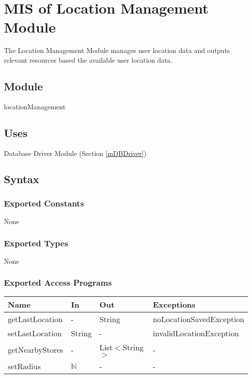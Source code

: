 \documentclass[12pt, titlepage]{article}
\begin{document}
\newpage

\section{MIS of Location Management Module} \label{mLocation} 
The Location Management Module manages user location data and outputs relevant resources based the available user location data.

\subsection{Module}

locationManagement

\subsection{Uses}

 Database Driver Module (Section \ref{mDBDriver})

\subsection{Syntax}

\subsubsection{Exported Constants}
None

\subsubsection{Exported Types}
None

\subsubsection{Exported Access Programs}

\begin{center}
\begin{tabular}{p{5cm} p{3cm} p{3cm} p{5cm}}
\hline
\textbf{Name} & \textbf{In} & \textbf{Out} & \textbf{Exceptions} \\
\hline
getLastLocation & - & String & noLocationSavedException \\
setLastLocation & String & - & invalidLocationException \\
getNearbyStores & - & List$<$String$>$ & - \\
setRadius & $\mathbb{N}$ & - & - \\
\hline
\end{tabular}
\end{center}
\end{document}
